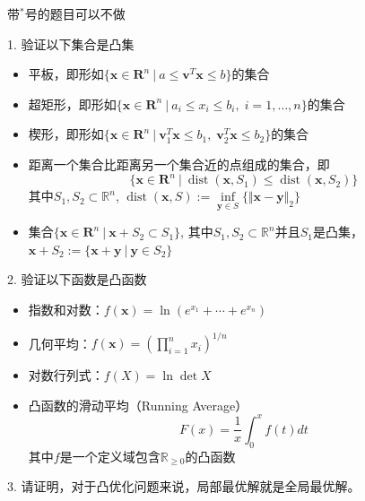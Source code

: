 \begin{frame}

{\color{red} \scriptsize 带$^*$号的题目可以不做}

\vspace{1em}

1. 验证以下集合是凸集
\begin{itemize}
\item[(1)] 平板，即形如$\{\mathbf{x} \in \mathbf{R}^n \ |\ a \le \mathbf{v}^T\mathbf{x} \le b \}$的集合
\item[(2)] 超矩形，即形如$\{\mathbf{x} \in \mathbf{R}^n \ |\ a_i \le x_i \le b_i, \; i=1,\ldots,n \}$的集合
\item[(3)] 楔形，即形如$\{\mathbf{x} \in \mathbf{R}^n \ |\ \mathbf{v}_1^T\mathbf{x} \le b_1, \; \mathbf{v}_2^T\mathbf{x} \le b_2 \}$的集合
\item[(4)] 距离一个集合比距离另一个集合近的点组成的集合，即
$$\{\mathbf{x} \in \mathbf{R}^n \ |\ \operatorname{dist}(\mathbf{x}, S_1) \le \operatorname{dist}(\mathbf{x}, S_2) \}$$
其中$S_1,S_2 \subset \mathbb{R}^n$, $\operatorname{dist}(\mathbf{x}, S) := \inf\limits_{\mathbf{y} \in S} \{ \Vert \mathbf{x} - \mathbf{y} \Vert_2 \}$
\item[(5)] 集合$\{\mathbf{x} \in \mathbf{R}^n \ |\ \mathbf{x} + S_2 \subset S_1 \}$, 其中$S_1,S_2 \subset \mathbb{R}^n$并且$S_1$是凸集，$\mathbf{x} + S_2 := \{ \mathbf{x} + \mathbf{y} \ |\ \mathbf{y} \in S_2 \}$
\end{itemize}

\end{frame}


\begin{frame}

2. 验证以下函数是凸函数
\begin{itemize}
\item[(1)] 指数和对数：$f(\mathbf{x}) = \ln(e^{x_1} + \cdots + e^{x_n})$
\item[(2)] 几何平均：$f(\mathbf{x}) = \left( \prod\limits_{i=1}^n x_i \right)^{1/n}$
\item[(3)] 对数行列式：$f(X) = \ln\det X$
\item[(4)] 凸函数的滑动平均（Running Average）
$$F(x) = \dfrac{1}{x}\int_0^{x} f(t) dt$$
其中$f$是一个定义域包含$\mathbb{R}_{\ge 0}$的凸函数
\end{itemize}

\vspace{1em}

3. 请证明，对于凸优化问题来说，局部最优解就是全局最优解。

\end{frame}

